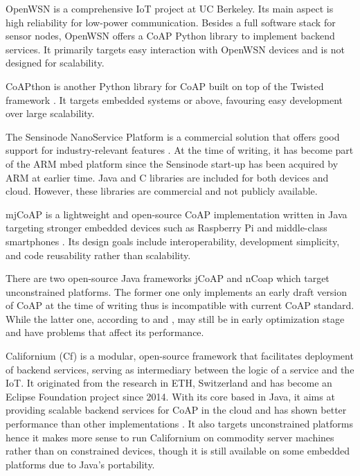 OpenWSN \cite{open-wsn} is a comprehensive IoT project at UC Berkeley. Its main aspect is high reliability for low-power communication. Besides a full software stack for sensor nodes, OpenWSN offers a CoAP Python library \cite{openwsn_python} to implement backend services. It primarily targets easy interaction with OpenWSN devices and is not designed for scalability.

CoAPthon \cite{7389028}\cite{coapthon_code} is another Python library for CoAP built on top of the Twisted framework \cite{twisted}. It targets embedded systems or above, favouring easy development over large scalability. 

The Sensinode NanoService Platform is a commercial solution that offers good support for industry-relevant features \cite{kovatsch2015scalable}. At the time of writing, it has become part of the ARM mbed platform \cite{mbed} since the Sensinode start-up has been acquired by ARM at earlier time. Java and C libraries are included for both devices and cloud. However, these libraries are commercial and not publicly available. 

mjCoAP is a lightweight and open-source CoAP implementation written in Java targeting stronger embedded devices such as Raspberry Pi and middle-class smartphones \cite{cirani2015mjcoap}\cite{kovatsch2015scalable}. Its design goals include interoperability, development simplicity, and code reusability rather than scalability.  

There are two open-source Java frameworks jCoAP \cite{jcoap} and nCoap \cite{ncoap} which target unconstrained platforms. The former one only implements an early draft version of CoAP at the time of writing thus is incompatible with current CoAP standard. While the latter one, according to \cite{lanter2013scalability} and \cite{kovatsch2015scalable}, may still be in early optimization stage and have problems that affect its performance.

Californium (Cf) \cite{californium} is a modular, open-source framework that facilitates deployment of backend services, serving as intermediary between the logic of a service and the IoT. It originated from the research in ETH, Switzerland and has become an Eclipse Foundation project since 2014. With its core based in Java, it aims at providing scalable backend services for CoAP in the cloud and has shown better performance than other implementations \cite{lanter2013scalability}\cite{kovatsch2014californium}\cite{kovatsch2015scalable}. It also targets unconstrained platforms hence it makes more sense to run Californium on commodity server machines rather than on constrained devices, though it is still available on some embedded platforms due to Java's portability. 

